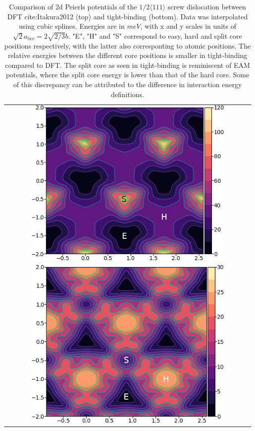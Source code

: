 \documentclass[a4paper,11pt]{article}
\begin{document}
        \begin{table}
    \begin{tabular}{c}
	     \includegraphics[width=0.8\textwidth]{../Images/itakura_dislocation_energy_landscape_2_labelled.png} \\
             \includegraphics[width=0.8\textwidth]{../Images/tbe_dislocation_energy_landscape_pure_labelled.png}  \\
    \end{tabular}		
\caption{Comparison of 2d Peierls potentials of the $1/2\langle 111\rangle$ screw dislocation between DFT cite:Itakura2012 (top) and tight-binding (bottom). Data was interpolated using cubic splines. Energies are in $meV$, with x and y scales in units of $\sqrt{2} a_{\text{bcc}} = 2\sqrt{2/3}b$. "E", "H" and "S" correspond to easy, hard and split core positions respectively, with the latter also corresponting to atomic positions. The relative energies between the different core positions is smaller in tight-binding compared to DFT. The split core as seen in tight-binding is reminiscent of EAM potentials, where the split core energy is lower than that of the hard core. Some of this discrepancy can be attributed to the difference in interaction energy definitions.}
	\label{fig:peierlspot}
    \end{table}
\end{document}
